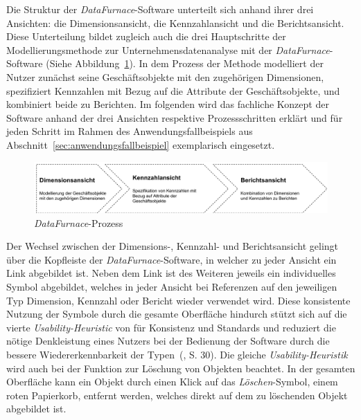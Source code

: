 \documentclass[
  language=german, %
  type=bachelor,%
  ngerman
]{isthesis}
\begin{document}
\begin{content}
  Die Struktur der \textit{DataFurnace}-Software unterteilt sich anhand ihrer
  drei Ansichten: die Dimensionsansicht, die Kennzahlansicht und die
  Berichtsansicht. Diese Unterteilung bildet zugleich auch die drei
  Hauptschritte der Modellierungsmethode zur Unternehmensdatenanalyse mit der
  \textit{DataFurnace}-Software (Siehe Abbildung~\ref{datafurnace-prozess}). In
  dem Prozess der Methode modelliert der Nutzer zunächst seine Geschäftsobjekte
  mit den zugehörigen Dimensionen, spezifiziert Kennzahlen mit Bezug auf die
  Attribute der Geschäftsobjekte, und kombiniert beide zu Berichten. Im
  folgenden wird das fachliche Konzept der Software anhand der drei Ansichten
  respektive Prozessschritten erklärt und für jeden Schritt im Rahmen des
  Anwendungsfallbeispiels aus Abschnitt~\ref{sec:anwendungsfallbeispiel}
  exemplarisch eingesetzt.

  \begin{figure}
    \includegraphics[scale=0.60]{content/figures/datafurnace-process}
    \caption{\textit{DataFurnace}-Prozess}\label{datafurnace-prozess}
  \end{figure}

  Der Wechsel zwischen der Dimensions-, Kennzahl- und Berichtsansicht gelingt
  über die Kopfleiste der \textit{DataFurnace}-Software, in welcher zu jeder
  Ansicht ein Link abgebildet ist. Neben dem Link ist des Weiteren jeweils ein
  individuelles Symbol abgebildet, welches in jeder Ansicht bei Referenzen auf
  den jeweiligen Typ Dimension, Kennzahl oder Bericht wieder verwendet wird.
  Diese konsistente Nutzung der Symbole durch die gesamte Oberfläche hindurch
  stützt sich auf die vierte \textit{Usability-Heuristic} von
  \textsc{\citeauthor{nielsen1994heuristic}} für Konsistenz und Standards und
  reduziert die nötige Denkleistung eines Nutzers bei der Bedienung der
  Software durch die bessere Wiedererkennbarkeit der
  Typen~(\citeyear{nielsen1994heuristic}, S. 30).  Die gleiche
  \textit{Usability-Heuristik} wird auch bei der Funktion zur Löschung von
  Objekten beachtet. In der gesamten Oberfläche kann ein Objekt durch einen
  Klick auf das \textit{Löschen}-Symbol, einem roten Papierkorb, entfernt
  werden, welches direkt auf dem zu löschenden Objekt abgebildet ist.



\end{content}
\end{document}
